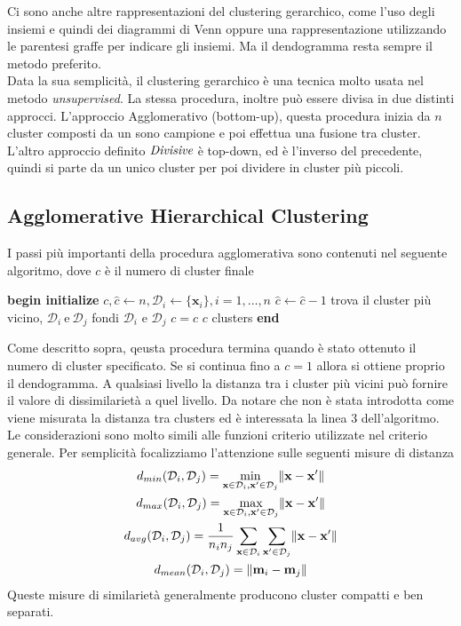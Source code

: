 \noindent Ci sono anche altre rappresentazioni del clustering gerarchico, come l'uso degli insiemi e quindi dei diagrammi di Venn oppure una rappresentazione utilizzando le parentesi graffe per indicare gli insiemi. Ma il dendogramma resta sempre il metodo preferito.\\

\noindent Data la sua semplicità, il clustering gerarchico è una tecnica molto usata nel metodo \emph{unsupervised}. La stessa procedura, inoltre può essere divisa in due distinti approcci. L'approccio Agglomerativo (bottom-up), questa procedura inizia da $n$ cluster composti da un sono campione e poi effettua una fusione tra cluster. L'altro approccio definito $\emph{Divisive}$ è top-down, ed è l'inverso del precedente, quindi si parte da un unico cluster per poi dividere in cluster più piccoli. 

\subsection{Agglomerative Hierarchical Clustering}
I passi più importanti della procedura agglomerativa sono contenuti nel seguente algoritmo, dove $c$ è il numero di cluster finale
\begin{codebox}
\li \textbf{begin initialize} $c, \hat{c} \gets n, \mathcal{D}_i \gets \{ \mathbf{x}_i \}, i=1,\dots, n$
\li	\Do $\hat{c} \gets \hat{c} - 1$
\li		trova il cluster più vicino, $\mathcal{D}_i \ \text{e} \ \mathcal{D}_j$
\li		fondi $\mathcal{D}_i$ e $\mathcal{D}_j$
	\End
\li	\Until	 $c=\hat{c}$
\li	\Return $c$ clusters
\li \textbf{end}	
\end{codebox}
Come descritto sopra, qeusta procedura termina quando è stato ottenuto il numero di cluster specificato. Se si continua fino a $c=1$ allora si ottiene proprio il dendogramma. A qualsiasi livello la distanza tra i cluster più vicini può fornire il valore di dissimilarietà a quel livello. Da notare che non è stata introdotta come viene misurata la distanza tra clusters ed è interessata la linea $3$ dell'algoritmo. Le considerazioni sono molto simili alle funzioni criterio utilizzate nel criterio generale. Per semplicità focalizziamo l'attenzione sulle seguenti misure di distanza
\begin{gather}
d_{min}(\mathcal{D}_i, \mathcal{D}_j) = \min_{\mathbf{x} \in \mathcal{D}_i, \mathbf{x}' \in \mathcal{D}_j} \lVert\mathbf{x} - \mathbf{x}'\rVert\\
d_{max}(\mathcal{D}_i, \mathcal{D}_j) = \max_{\mathbf{x} \in \mathcal{D}_i, \mathbf{x}' \in \mathcal{D}_j} \lVert\mathbf{x} - \mathbf{x}'\rVert \\
d_{avg}(\mathcal{D}_i, \mathcal{D}_j) = \frac{1}{n_i n_j} \sum_{\mathbf{x} \in \mathcal{D}_i} \sum_{\mathbf{x}' \in \mathcal{D}_j} \lVert\mathbf{x} - \mathbf{x}'\rVert\\
d_{mean}(\mathcal{D}_i, \mathcal{D}_j) = \lVert\mathbf{m}_i - \mathbf{m}_j\rVert  
\end{gather}
Queste misure di similarietà generalmente producono cluster compatti e ben separati.

